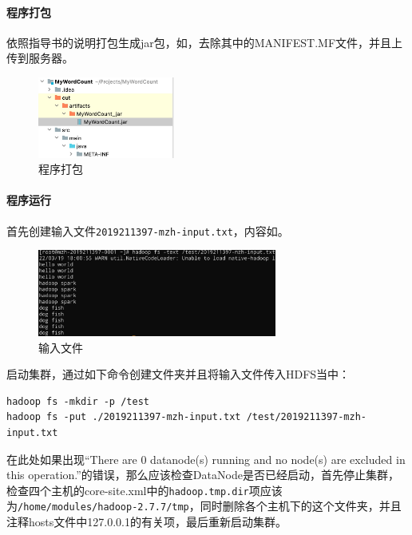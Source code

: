 \documentclass[lang=cn,11pt,a4paper,cite=authornum]{paper}
\begin{document}
\paragraph{程序打包}

依照指导书的说明打包生成jar包，如，去除其中的MANIFEST.MF文件，并且上传到服务器。

\begin{figure}[!htb]
    \centering
    \includegraphics[width=0.4\textwidth]{./images/jar.jpg}
    \caption{程序打包\label{fig:jar}}
\end{figure}

\paragraph{程序运行}

首先创建输入文件\texttt{2019211397-mzh-input.txt}，内容如。

\begin{figure}[!htb]
    \centering
    \includegraphics[width=0.7\textwidth]{./images/input.jpg}
    \caption{输入文件\label{fig:input}}
\end{figure}

启动集群，通过如下命令创建文件夹并且将输入文件传入HDFS当中：

\begin{code}
\begin{verbatim}
hadoop fs -mkdir -p /test
hadoop fs -put ./2019211397-mzh-input.txt /test/2019211397-mzh-input.txt
\end{verbatim}
\end{code}

在此处如果出现“There are 0 datanode(s) running and no node(s) are excluded in this operation.”的错误，那么应该检查DataNode是否已经启动，首先停止集群，检查四个主机的core-site.xml中的\texttt{hadoop.tmp.dir}项应该为\texttt{/home/modules/hadoop-2.7.7/tmp}，同时删除各个主机下的这个文件夹，并且注释hosts文件中127.0.0.1的有关项，最后重新启动集群。
\end{document}
